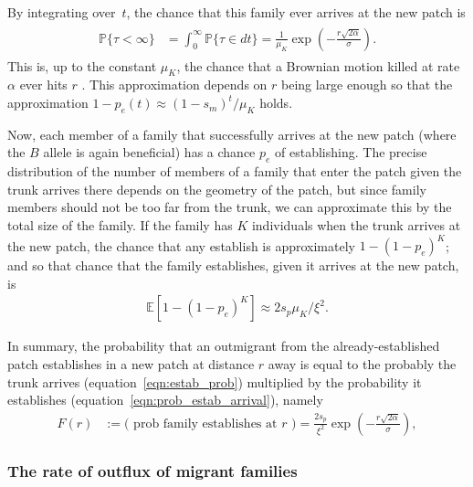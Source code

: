\documentclass{article}
\renewcommand{\P}{\mathbb{P}}
\newcommand{\E}{\mathbb{E}}
\begin{document}
By integrating over~$t$, the chance that this family ever arrives at the new patch is
\begin{align} 
\label{eqn:estab_prob}
  \begin{split}
      \P\{ \tau < \infty \} &= \int_0^\infty \P\{ \tau \in dt \} = \frac{1}{\mu_K} \exp\left( - \frac{ r \sqrt{2 \alpha}}{\sigma} \right) .
  \end{split}
\end{align}
This is, up to the constant $\mu_K$, the chance that a Brownian motion killed at rate $\alpha$
ever hits $r$ \citep{feller}.
This approximation depends on $r$ being large enough so that the approximation $1-p_e(t) \approx (1-s_m)^t/\mu_K$ holds.

Now, each member of a family that successfully arrives at the new patch
(where the $B$ allele is again beneficial)
has a chance $p_e$ of establishing.
The precise distribution of the number of members of a family that enter the patch
given the trunk arrives there
depends on the geometry of the patch,
but since family members should not be too far from the trunk,
we can approximate this by the total size of the family.
If the family has $K$ individuals when the trunk arrives at the new patch,
the chance that any establish is approximately $1-(1-p_e)^K$;
and so that chance that the family establishes, given it arrives at the new patch, 
is 
\begin{align}
    \label{eqn:prob_estab_arrival}
    \E[1-(1-p_e)^K] \approx 2 s_p \mu_K/\xi^2 .
\end{align}

In summary, the probability that an outmigrant from the already-established patch establishes in a new patch at distance $r$ away is 
equal to the probably the trunk arrives (equation~\eqref{eqn:estab_prob}) multiplied by the probability it establishes (equation~\eqref{eqn:prob_estab_arrival}),
namely
\begin{align} \label{eqn:bp_prob_estab}
    F(r) &:= \text{( prob family establishes at $r$ )} = \frac{2s_p}{\xi^2} \exp\left( - \frac{r \sqrt{2 \alpha}}{\sigma} \right) ,
\end{align}



\subsubsection{The rate of outflux of migrant families}
\end{document}
